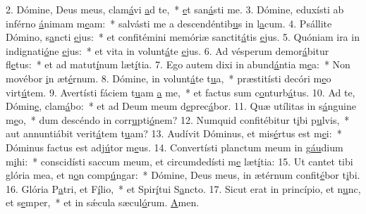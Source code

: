 2. Dómine, Deus meus, clam\uline{á}vi \uline{a}d te,~* \uline{e}t san\uline{á}sti me.
3. Dómine, eduxísti ab inférno \uline{á}nimam m\uline{e}am:~* salvásti me a descendéntib\uline{u}s in l\uline{a}cum.
4. Psállite Dómino, s\uline{a}ncti \uline{e}jus:~* et confitémini memóriæ sanctit\uline{á}tis \uline{e}jus.
5. Quóniam ira in indignati\uline{ó}ne \uline{e}jus:~* et vita in volunt\uline{á}te \uline{e}jus.
6. Ad vésperum demor\uline{á}bitur fl\uline{e}tus:~* et ad matut\uline{í}num læt\uline{í}tia.
7. Ego autem dixi in abund\uline{á}ntia m\uline{e}a:~* Non movébor \uline{i}n æt\uline{é}rnum.
8. Dómine, in volunt\uline{á}te t\uline{u}a,~* præstitísti decóri m\uline{e}o virt\uline{ú}tem.
9. Avertísti fáciem t\uline{u}am \uline{a} me,~* et factus sum c\uline{o}nturb\uline{á}tus.
10. Ad te, Dómin\uline{e}, clam\uline{á}bo:~* et ad Deum meum d\uline{e}prec\uline{á}bor.
11. Quæ utílitas in s\uline{á}nguine m\uline{e}o,~* dum descéndo in corr\uline{u}pti\uline{ó}nem?
12. Numquid confitébitur t\uline{i}bi p\uline{u}lvis,~* aut annuntiábit verit\uline{á}tem t\uline{u}am?
13. Audívit Dóminus, et mis\uline{é}rtus est m\uline{e}i:~* Dóminus factus est adj\uline{ú}tor m\uline{e}us.
14. Convertísti planctum meum in g\uline{áu}dium m\uline{i}hi:~* conscidísti saccum meum, et circumdedísti m\uline{e} læt\uline{í}tia:
15. Ut cantet tibi glória mea, et n\uline{o}n comp\uline{ú}ngar:~* Dómine, Deus meus, in ætérnum confit\uline{é}bor t\uline{i}bi.
16. Glória P\uline{a}tri, et F\uline{í}lio,~* et Spir\uline{í}tui S\uline{a}ncto.
17. Sicut erat in princípio, et n\uline{u}nc, et s\uline{e}mper,~* et in sǽcula sæcul\uline{ó}rum. \uline{A}men.
